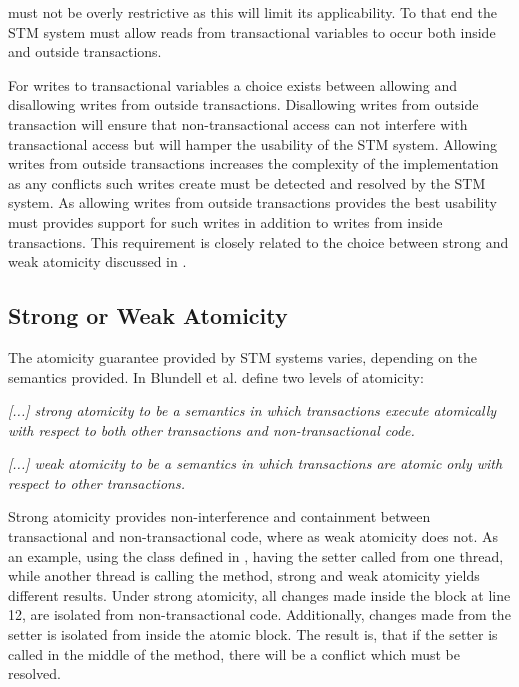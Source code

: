 \stmnamesp must not be overly restrictive as this will limit its applicability. To that end the \ac{STM} system must allow reads from transactional variables to occur both inside and outside transactions. 

For writes to transactional variables a choice exists between allowing and disallowing writes from outside transactions. Disallowing writes from outside transaction will ensure that non-transactional access can not interfere with transactional access but will hamper the usability of the \ac{STM} system. Allowing writes from outside transactions increases the complexity of the implementation as any conflicts such writes create must be detected and resolved by the \ac{STM} system. As allowing writes from outside transactions provides the best usability \stmnamesp must provides support for such writes in addition to writes from inside transactions. This requirement is closely related to the choice between strong and weak atomicity discussed in .

\subsection{Strong or Weak Atomicity}
\label{sec:design_strong_weak_atomicity}
The atomicity guarantee provided by \ac{STM} systems varies, depending on the semantics provided. In \cite{blundell2006subtleties} Blundell et al. define two levels of atomicity:
%
\begin{defn}\label{def:strong_atomicity}
\emph{[...] strong atomicity to be a semantics in which transactions execute atomically
with respect to both other transactions and non-transactional code.}
\end{defn}
%
\begin{defn}\label{def:weak_atomicity}
\emph{[...] weak atomicity to be a semantics in which transactions are atomic only with respect to other transactions.}
\end{defn}

Strong atomicity provides non-interference and containment between transactional and non-transactional code, where as weak atomicity does not. As an example, using the  class defined in , having the  setter called from one thread, while another thread is calling the  method, strong and weak atomicity yields different results. Under strong atomicity, all changes made inside the  block at line 12, are isolated from non-transactional code. Additionally, changes made from the setter is isolated from inside the atomic block. The result is, that if the setter is called in the middle of the  method, there will be a conflict which must be resolved. 

